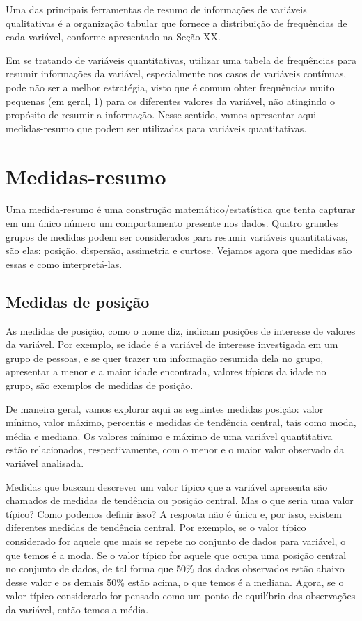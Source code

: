 \documentclass[
  letterpaper,
  DIV=11,
  numbers=noendperiod]{scrreprt}
\begin{document}
Uma das principais ferramentas de resumo de informações de variáveis
qualitativas é a organização tabular que fornece a distribuição de
frequências de cada variável, conforme apresentado na Seção XX.

Em se tratando de variáveis quantitativas, utilizar uma tabela de
frequências para resumir informações da variável, especialmente nos
casos de variáveis contínuas, pode não ser a melhor estratégia, visto
que é comum obter frequências muito pequenas (em geral, 1) para os
diferentes valores da variável, não atingindo o propósito de resumir a
informação. Nesse sentido, vamos apresentar aqui medidas-resumo que
podem ser utilizadas para variáveis quantitativas.

\hypertarget{medidas-resumo}{%
\section{Medidas-resumo}\label{medidas-resumo}}

Uma medida-resumo é uma construção matemático/estatística que tenta
capturar em um único número um comportamento presente nos dados. Quatro
grandes grupos de medidas podem ser considerados para resumir variáveis
quantitativas, são elas: posição, dispersão, assimetria e curtose.
Vejamos agora que medidas são essas e como interpretá-las.

\hypertarget{medidas-de-posiuxe7uxe3o}{%
\subsection{Medidas de posição}\label{medidas-de-posiuxe7uxe3o}}

As medidas de posição, como o nome diz, indicam posições de interesse de
valores da variável. Por exemplo, se idade é a variável de interesse
investigada em um grupo de pessoas, e se quer trazer um informação
resumida dela no grupo, apresentar a menor e a maior idade encontrada,
valores típicos da idade no grupo, são exemplos de medidas de posição.

De maneira geral, vamos explorar aqui as seguintes medidas posição:
valor mínimo, valor máximo, percentis e medidas de tendência central,
tais como moda, média e mediana. Os valores mínimo e máximo de uma
variável quantitativa estão relacionados, respectivamente, com o menor e
o maior valor observado da variável analisada.

Medidas que buscam descrever um valor típico que a variável apresenta
são chamados de medidas de tendência ou posição central. Mas o que seria
uma valor típico? Como podemos definir isso? A resposta não é única e,
por isso, existem diferentes medidas de tendência central. Por exemplo,
se o valor típico considerado for aquele que mais se repete no conjunto
de dados para variável, o que temos é a moda. Se o valor típico for
aquele que ocupa uma posição central no conjunto de dados, de tal forma
que 50\% dos dados observados estão abaixo desse valor e os demais 50\%
estão acima, o que temos é a mediana. Agora, se o valor típico
considerado for pensado como um ponto de equilíbrio das observações da
variável, então temos a média.
\end{document}
